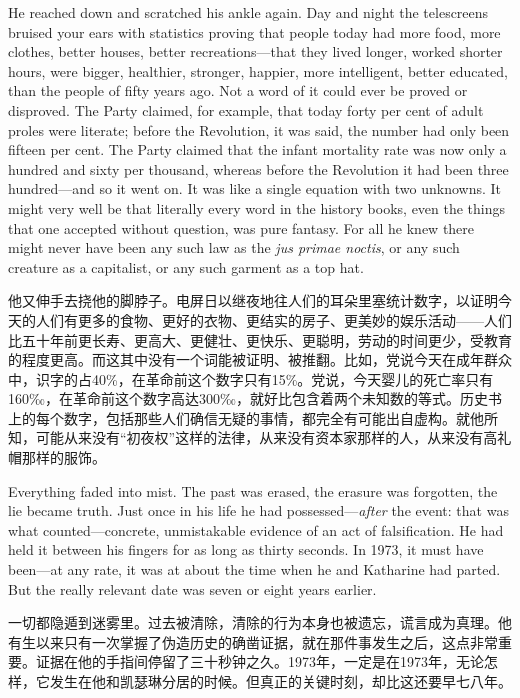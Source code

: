 \begin{paracol}{2}
\switchcolumn*

He reached down and scratched his ankle again. Day and night the
telescreens bruised your ears with statistics proving that people today
had more food, more clothes, better houses, better recreations---that
they lived longer, worked shorter hours, were bigger, healthier,
stronger, happier, more intelligent, better educated, than the people of
fifty years ago. Not a word of it could ever be proved or disproved. The
Party claimed, for example, that today forty per cent of adult proles
were literate; before the Revolution, it was said, the number had only
been fifteen per cent. The Party claimed that the infant mortality rate
was now only a hundred and sixty per thousand, whereas before the
Revolution it had been three hundred---and so it went on. It was like a
single equation with two unknowns. It might very well be that literally
every word in the history books, even the things that one accepted
without question, was pure fantasy. For all he knew there might never
have been any such law as the \emph{jus primae noctis}, or any such
creature as a capitalist, or any such garment as a top hat.

\switchcolumn

他又伸手去挠他的脚脖子。电屏日以继夜地往人们的耳朵里塞统计数字，以证明今天的人们有更多的食物、更好的衣物、更结实的房子、更美妙的娱乐活动——人们比五十年前更长寿、更高大、更健壮、更快乐、更聪明，劳动的时间更少，受教育的程度更高。而这其中没有一个词能被证明、被推翻。比如，党说今天在成年群众中，识字的占40\%，在革命前这个数字只有15\%。党说，今天婴儿的死亡率只有160‰，在革命前这个数字高达300‰，就好比包含着两个未知数的等式。历史书上的每个数字，包括那些人们确信无疑的事情，都完全有可能出自虚构。就他所知，可能从来没有``初夜权''这样的法律，从来没有资本家那样的人，从来没有高礼帽那样的服饰。

\switchcolumn*

Everything faded into mist. The past was erased, the erasure was
forgotten, the lie became truth. Just once in his life he had
possessed---\emph{after} the event: that was what counted---concrete,
unmistakable evidence of an act of falsification. He had held it between
his fingers for as long as thirty seconds. In 1973, it must have
been---at any rate, it was at about the time when he and Katharine had
parted. But the really relevant date was seven or eight years earlier.

\switchcolumn

一切都隐遁到迷雾里。过去被清除，清除的行为本身也被遗忘，谎言成为真理。他有生以来只有一次掌握了伪造历史的确凿证据，就在那件事发生之后，这点非常重要。证据在他的手指间停留了三十秒钟之久。1973年，一定是在1973年，无论怎样，它发生在他和凯瑟琳分居的时候。但真正的关键时刻，却比这还要早七八年。


\end{paracol}

